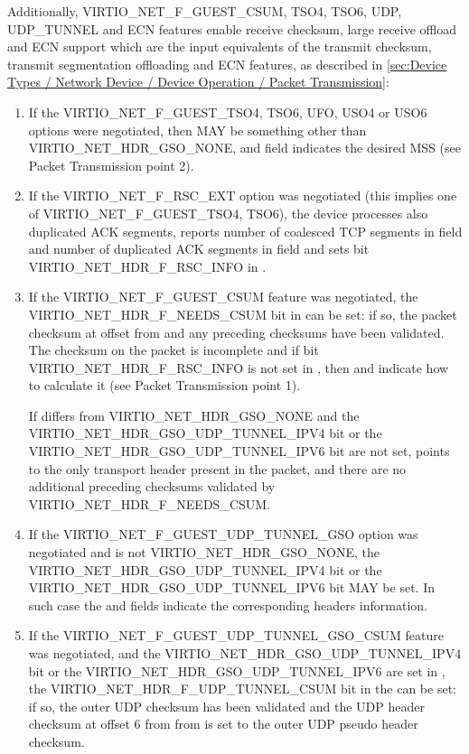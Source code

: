 Additionally, VIRTIO_NET_F_GUEST_CSUM, TSO4, TSO6, UDP, UDP_TUNNEL
and ECN features enable receive checksum, large receive offload and ECN
support which are the input equivalents of the transmit checksum,
transmit segmentation offloading and ECN features, as described
in \ref{sec:Device Types / Network Device / Device Operation /
Packet Transmission}:
\begin{enumerate}
\item If the VIRTIO_NET_F_GUEST_TSO4, TSO6, UFO, USO4 or USO6 options were
  negotiated, then  MAY be something other than
  VIRTIO_NET_HDR_GSO_NONE, and  field indicates the
  desired MSS (see Packet Transmission point 2).
\item If the VIRTIO_NET_F_RSC_EXT option was negotiated (this
  implies one of VIRTIO_NET_F_GUEST_TSO4, TSO6), the
  device processes also duplicated ACK segments, reports
  number of coalesced TCP segments in  field and
  number of duplicated ACK segments in  field
  and sets bit VIRTIO_NET_HDR_F_RSC_INFO in .
\item If the VIRTIO_NET_F_GUEST_CSUM feature was negotiated, the
  VIRTIO_NET_HDR_F_NEEDS_CSUM bit in  can be
  set: if so, the packet checksum at offset 
  from  and any preceding checksums
  have been validated.  The checksum on the packet is incomplete and
  if bit VIRTIO_NET_HDR_F_RSC_INFO is not set in ,
  then  and  indicate how to calculate it
  (see Packet Transmission point 1).
\begin{note}
If  differs from VIRTIO_NET_HDR_GSO_NONE and the
VIRTIO_NET_HDR_GSO_UDP_TUNNEL_IPV4 bit or the VIRTIO_NET_HDR_GSO_UDP_TUNNEL_IPV6
bit are not set, 
points to the only transport header present in the packet, and there are no
additional preceding checksums validated by VIRTIO_NET_HDR_F_NEEDS_CSUM.
\end{note}
\item If the VIRTIO_NET_F_GUEST_UDP_TUNNEL_GSO option was negotiated and
   is not VIRTIO_NET_HDR_GSO_NONE, the
  VIRTIO_NET_HDR_GSO_UDP_TUNNEL_IPV4 bit or the VIRTIO_NET_HDR_GSO_UDP_TUNNEL_IPV6
  bit MAY be set. In such case the  and
   fields indicate the corresponding
  headers information.
\item If the VIRTIO_NET_F_GUEST_UDP_TUNNEL_GSO_CSUM feature was
negotiated, and
  the VIRTIO_NET_HDR_GSO_UDP_TUNNEL_IPV4 bit or the VIRTIO_NET_HDR_GSO_UDP_TUNNEL_IPV6
  are set in , the VIRTIO_NET_HDR_F_UDP_TUNNEL_CSUM bit in the
   can be set: if so, the outer UDP checksum has been validated
  and the UDP header checksum at offset 6 from from 
  is set to the outer UDP pseudo header checksum.


\end{enumerate}
